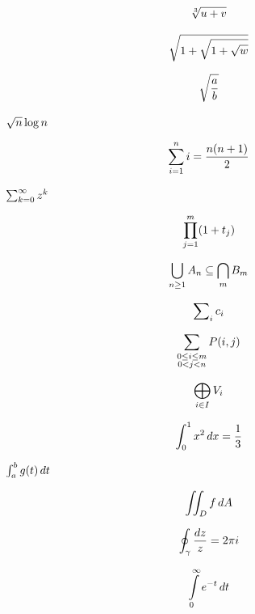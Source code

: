 \documentclass{article}
\newcommand*\pdfcraftbegin[1]{\special{pdfcraft:eq:#1:begin}}
\newcommand*\pdfcraftend[1]{\special{pdfcraft:eq:#1:end}}
\begin{document}
\par
\newpage
\setcounter{equation}{0}
\[\pdfcraftbegin{sqrt_cube}
\sqrt[3]{u + v}
\pdfcraftend{sqrt_cube}\]
\par
\newpage
\setcounter{equation}{0}
\[\pdfcraftbegin{sqrt_nested}
\sqrt{1 + \sqrt{1 + \sqrt{w}}}
\pdfcraftend{sqrt_nested}\]
\par
\newpage
\setcounter{equation}{0}
\[\pdfcraftbegin{sqrt_tall}
\sqrt{\frac{a}{b}}
\pdfcraftend{sqrt_tall}\]
\par
\newpage
\setcounter{equation}{0}
$\pdfcraftbegin{sqrt_inline}
\sqrt{n}\log n
\pdfcraftend{sqrt_inline}$
\par
\newpage
\setcounter{equation}{0}
\[\pdfcraftbegin{sum_gauss}
\sum_{i=1}^{n} i = \frac{n(n+1)}{2}
\pdfcraftend{sum_gauss}\]
\par
\newpage
\setcounter{equation}{0}
$\pdfcraftbegin{sum_inline}
\sum_{k=0}^{\infty} z^k
\pdfcraftend{sum_inline}$
\par
\newpage
\setcounter{equation}{0}
\[\pdfcraftbegin{prod_display}
\prod_{j=1}^{m} (1 + t_j)
\pdfcraftend{prod_display}\]
\par
\newpage
\setcounter{equation}{0}
\[\pdfcraftbegin{union_intersection}
\bigcup_{n \ge 1} A_n \subseteq \bigcap_{m} B_m
\pdfcraftend{union_intersection}\]
\par
\newpage
\setcounter{equation}{0}
\[\pdfcraftbegin{sum_nolimits}
\sum\nolimits_{i} c_i
\pdfcraftend{sum_nolimits}\]
\par
\newpage
\setcounter{equation}{0}
\[\pdfcraftbegin{sum_substack}
\sum_{\substack{0 \le i \le m \\ 0 < j < n}} P(i,j)
\pdfcraftend{sum_substack}\]
\par
\newpage
\setcounter{equation}{0}
\[\pdfcraftbegin{direct_sum}
\bigoplus_{i \in I} V_i
\pdfcraftend{direct_sum}\]
\par
\newpage
\setcounter{equation}{0}
\[\pdfcraftbegin{int_power}
\int_0^1 x^2\,dx = \frac{1}{3}
\pdfcraftend{int_power}\]
\par
\newpage
\setcounter{equation}{0}
$\pdfcraftbegin{int_inline}
\int_a^b g(t)\,dt
\pdfcraftend{int_inline}$
\par
\newpage
\setcounter{equation}{0}
\[\pdfcraftbegin{int_double}
\iint_{D} f\,dA
\pdfcraftend{int_double}\]
\par
\newpage
\setcounter{equation}{0}
\[\pdfcraftbegin{int_contour}
\oint_{\gamma} \frac{dz}{z} = 2\pi i
\pdfcraftend{int_contour}\]
\par
\newpage
\setcounter{equation}{0}
\[\pdfcraftbegin{int_limits}
\int\limits_{0}^{\infty} e^{-t}\,dt
\pdfcraftend{int_limits}\]
\end{document}
